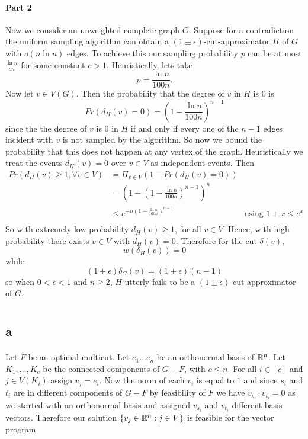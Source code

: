 \documentclass[letterpaper,12pt,oneside,onecolumn]{article}
\begin{document}
\paragraph{Part 2}
Now we consider an unweighted complete graph $G$. Suppose for a contradiction the uniform sampling algorithm can obtain a  $(1\pm \epsilon)$-cut-approximator $H$ of $G$ with $o(n\ln n)$ edges. To achieve this our sampling probability $p$ can be at most $\frac{\ln n}{c n}$ for some constant $c>1$. Heuristically, lets take
$$p= \frac{\ln n}{100 n}.$$
Now let $v \in V(G)$. Then the probability that the degree of $v$ in $H$ is $0$ is
$$Pr(d_H(v) = 0) = (1- \frac{\ln n}{100n})^{n-1}$$
since the the degree of $v$ is $0$ in $H$ if and only if every one of the $n-1$ edges incident with $v$ is not sampled by the algorithm. So now we bound the probability that this does not happen at any vertex of the graph. Heuristically we treat the events $d_H(v) = 0$ over $v \in V$ as independent events. Then
\begin{align*}
Pr(d_H(v) \geq 1, \forall v \in V) &= \Pi_{v\in V} (1-Pr(d_H(v) = 0)) \\
&=(1-(1- \frac{\ln n}{100n})^{n-1})^n \\
&\leq e^{-n(1- \frac{\ln n}{100n})^{n-1}} &\text{using $1+x \leq e^x$} \\
\end{align*} 
So with extremely low probability $d_H(v) \geq 1$, for all $v \in V$. Hence, with high probability there exists $v \in V$ with $d_H(v) = 0$. Therefore for the cut $\delta(v)$, 
$$w(\delta_H(v)) = 0$$
while 
$$(1\pm \epsilon)\delta_G(v) = (1\pm \epsilon)(n-1)$$
so when $0 <\epsilon < 1$ and $n\geq 2$, $H$ utterly fails to be a $(1\pm \epsilon)$-cut-approximator of $G$.
\newpage
\section{}
\subsection{a}
\paragraph{}
Let $F$ be an optimal multicut. Let $e_1 \dots e_n$ be an orthonormal basis of $\mathbb{R}^n$. Let $K_1, \dots, K_c$ be the connected components of $G-F$, with $c\leq n$. For all $i \in [c]$ and $j \in V(K_i)$ assign $v_j = e_i$. Now the norm of each $v_i$ is equal to $1$ and since $s_i$ and $t_i$ are in different components of $G-F$ by feasibility of $F$ we have $v_{s_i}\cdot v_{t_i} = 0$ as we started with an orthonormal basis and assigned $v_{s_i}$ and $v_{t_i}$ different basis vectors. Therefore our solution $\{v_j \in \mathbb{R}^n: j \in V\}$ is feasible for the vector program. 
\end{document}
